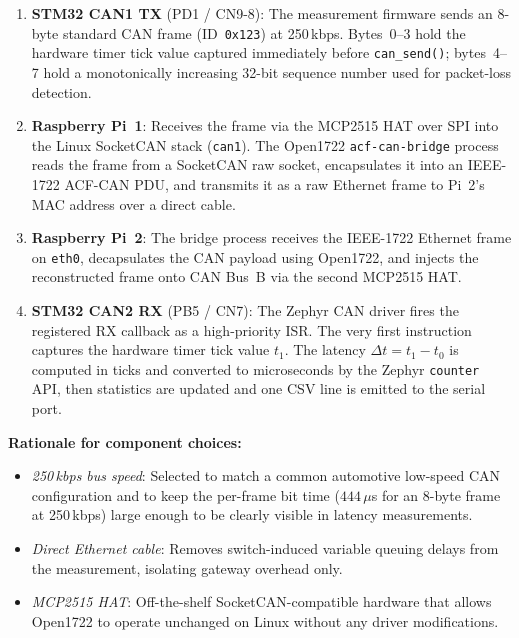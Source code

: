 \documentclass[11pt,a4paper]{article}
\begin{document}
\begin{enumerate}
    \item \textbf{STM32 CAN1 TX} (PD1 / CN9-8): The measurement firmware sends an 8-byte
          standard CAN frame (ID~\texttt{0x123}) at 250\,kbps.  Bytes~0--3 hold the
          hardware timer tick value captured immediately before \texttt{can\_send()};
          bytes~4--7 hold a monotonically increasing 32-bit sequence number used for
          packet-loss detection.
    \item \textbf{Raspberry Pi~1}: Receives the frame via the MCP2515 HAT over SPI into
          the Linux SocketCAN stack (\texttt{can1}).  The Open1722
          \texttt{acf-can-bridge} process reads the frame from a SocketCAN raw socket,
          encapsulates it into an IEEE-1722 ACF-CAN PDU, and transmits it as a raw
          Ethernet frame to Pi~2's MAC address over a direct cable.
    \item \textbf{Raspberry Pi~2}: The bridge process receives the IEEE-1722 Ethernet
          frame on \texttt{eth0}, decapsulates the CAN payload using Open1722, and
          injects the reconstructed frame onto CAN Bus~B via the second MCP2515 HAT.
    \item \textbf{STM32 CAN2 RX} (PB5 / CN7): The Zephyr CAN driver fires the
          registered RX callback as a high-priority ISR.  The very first instruction
          captures the hardware timer tick value $t_1$.  The latency
          $\Delta t = t_1 - t_0$ is computed in ticks and converted to microseconds
          by the Zephyr \texttt{counter} API, then statistics are updated and one
          CSV line is emitted to the serial port.
\end{enumerate}

\textbf{Rationale for component choices:}
\begin{itemize}
    \item \emph{250\,kbps bus speed}: Selected to match a common automotive low-speed
          CAN configuration and to keep the per-frame bit time ($444\,\mu$s for an
          8-byte frame at 250\,kbps) large enough to be clearly visible in latency measurements.
    \item \emph{Direct Ethernet cable}: Removes switch-induced variable queuing delays
          from the measurement, isolating gateway overhead only.
    \item \emph{MCP2515 HAT}: Off-the-shelf SocketCAN-compatible hardware that allows
          Open1722 to operate unchanged on Linux without any driver modifications.
\end{itemize}
\end{document}
